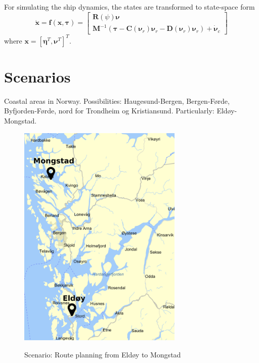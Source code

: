 For simulating the ship dynamics, the states are transformed to state-space form
\begin{equation}
	\label{eq:x_dot}
	\dot{\boldsymbol{x}} = \boldsymbol{f}(\boldsymbol{x}, \boldsymbol{\tau}) = \begin{bmatrix}
		\boldsymbol{R}(\psi)\boldsymbol{\nu} \\
		\boldsymbol{M}^{-1}(\boldsymbol{\tau}  - \boldsymbol{C}(\boldsymbol{\nu}_r)\boldsymbol{\nu}_r - \boldsymbol{D}(\boldsymbol{\nu}_r)\boldsymbol{\nu}_r) + \dot{\boldsymbol{\nu}}_c
	\end{bmatrix}
\end{equation}
where $\boldsymbol{x}= [\boldsymbol{\eta}^T, \boldsymbol{\nu}^T]^T$.



\section{Scenarios}
Coastal areas in Norway. Possibilities: Haugesund-Bergen, Bergen-Førde, Byfjorden-Førde, nord for Trondheim og Kristiansund. Particularly: Eldøy-Mongstad.

\begin{figure}[H]
\centering
\includegraphics[width=0.7\textwidth]{fig/scenario}
\label{fig:scenario}
\caption{Scenario: Route planning from Eldøy to Mongstad}
\label{fig:scenario}
\end{figure}


